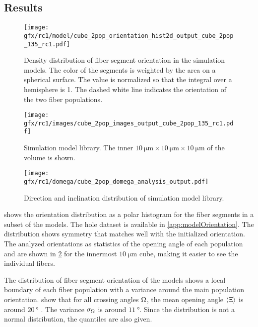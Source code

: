 \subsection{Results}
%
\begin{figure}[!t]
\centering
\texttt{[image: gfx/rc1/model/cube\_2pop\_orientation\_hist2d\_output\_cube\_2pop\_135\_rc1.pdf]}
\caption{Density distribution of fiber segment orientation in the simulation models. The color of the segments is weighted by the area on a spherical surface. The value is normalized so that the integral over a hemisphere is 1. The dashed white line indicates the orientation of the two fiber populations.}
\label{fig:modelOrientation}
\end{figure}
%
\begin{figure}[!t]
\centering
\texttt{[image: gfx/rc1/images/cube\_2pop\_images\_output\_cube\_2pop\_135\_rc1.pdf]}
\caption[solved model images]{Simulation model library. The inner $\SI{10}{\micro\meter} \times \SI{10}{\micro\meter} \times \SI{10}{\micro\meter}$ of the volume is shown.}
\label{fig:modelImages}
\end{figure}
%
\begin{figure}[!t]
    \centering
    \texttt{[image: gfx/rc1/domega/cube\_2pop\_domega\_analysis\_output.pdf]}
    \caption{Direction and inclination distribution of simulation model library. }
\end{figure}
%
 shows the orientation distribution as a polar histogram for the fiber segments in a subset of the models.
The hole dataset is available in \cref{app:modelOrientation}.
The distribution shows symmetry that matches well with the initialized orientation.
The analyzed orientations as statistics of the opening angle \openingAngle{} of each population \popa{} and \popb{} are shown in \cref{fig:modelImages} for the innermost $\SI{10}{\micro\meter}$ cube, making it easier to see the individual fibers.
\par
%
The distribution of fiber segment orientation of the models shows a local boundary of each fiber population with a variance around the main population orientation.
 show that for all crossing angles $\textnormal{$\Omega$}$, the mean opening angle $\langle \textnormal{$\Xi$} \rangle$ is around $\SI{20}{\degree}$ .
The variance $\sigma_{\textnormal{$\Omega$}}$ is around $\SI{11}{\degree}$.
Since the distribution is not a normal distribution, the quantiles are also given.
